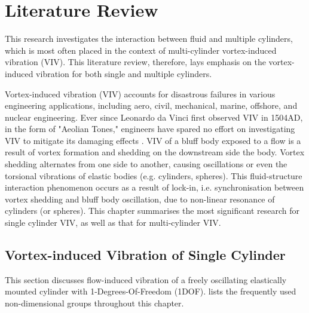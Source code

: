 \chapter{Literature Review}  \label{cha Literature Review}%


 \graphicspath{{Figs/}}
 
 



This research investigates the interaction between fluid and multiple cylinders, which is most often placed in the context of multi-cylinder vortex-induced vibration (VIV). This literature review, therefore, lays emphasis on the vortex-induced vibration for both single and multiple cylinders.

Vortex-induced vibration (VIV) accounts for disastrous failures in various engineering applications, including aero, civil, mechanical, marine, offshore, and nuclear engineering. Ever since Leonardo da Vinci first observed VIV in 1504AD, in the form of  "Aeolian Tones," engineers have spared no effort on investigating VIV to mitigate its damaging effects \cite{vortexhydroenergy}. VIV of a bluff body exposed to a flow is a result of vortex formation and shedding on the downstream side the body. Vortex shedding alternates from one side to another, causing oscillations or even the torsional vibrations of elastic bodies (e.g. cylinders, spheres). This fluid-structure interaction phenomenon occurs as a result of lock-in, i.e. synchronisation between vortex shedding and bluff body oscillation, due to non-linear resonance of cylinders (or spheres). This chapter summarises the most significant research for single cylinder VIV, as well as that for multi-cylinder VIV. 


\section{Vortex-induced Vibration of Single Cylinder} \label{sec:VIV1}%

This section discusses flow-induced vibration of a freely oscillating elastically mounted cylinder with 1-Degrees-Of-Freedom (1DOF).  lists the frequently used non-dimensional groups throughout this chapter.

